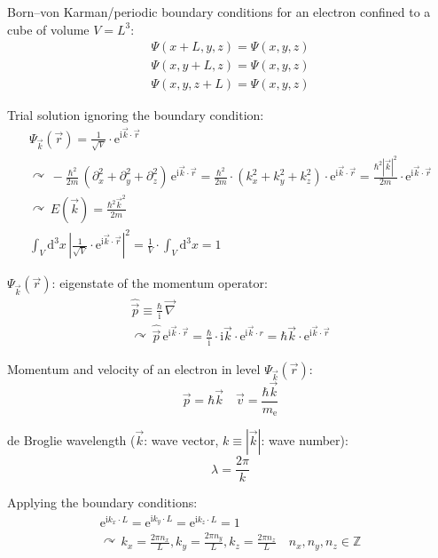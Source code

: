 \documentclass[fontsize=11pt,a4paper]{scrartcl}
\begin{document}
Born--von Karman/periodic boundary conditions for an electron confined to a cube of volume $V=L^3$:
\begin{gather*}
	\Psi(x+L,y,z)=\Psi(x,y,z)\\
	\Psi(x,y+L,z)=\Psi(x,y,z)\\
	\Psi(x,y,z+L)=\Psi(x,y,z)
\end{gather*}

Trial solution ignoring the boundary condition:
\begin{gather*}
	\Psi_{\vec k}(\vec r)=\frac{1}{\sqrt{V}}\cdot\mathrm{e}^{\mathrm{i}\vec k\cdot\vec r}\\
	\curvearrowright\,-\frac{\hbar^2}{2m}\,(\partial_x^2+\partial_y^2+\partial_z^2)\,\mathrm{e}^{\mathrm{i}\vec k\cdot\vec r}=\frac{\hbar^2}{2m}\cdot(k_x^2+k_y^2+k_z^2)\cdot\mathrm{e}^{\mathrm{i}\vec k\cdot\vec r}=\frac{\hbar^2|\vec k|^2}{2m}\cdot\mathrm{e}^{\mathrm{i}\vec k\cdot\vec r}\\
	\curvearrowright\,E(\vec k)=\frac{\hbar^2\vec k^2}{2m}\\
	\int_V\mathrm{d}^3x\,\left|\frac{1}{\sqrt{V}}\cdot\mathrm{e}^{\mathrm{i}\vec k\cdot\vec r}\right|^2=\frac{1}{V}\cdot\int_V\mathrm{d}^3x=1
\end{gather*}

$\Psi_{\vec k}(\vec r)$: eigenstate of the momentum operator:
\begin{gather*}
	\hat{\vec{p}}\equiv\frac{\hbar}{\mathrm{i}}\,\vec\nabla\\
	\curvearrowright\,\hat{\vec{p}}\,\mathrm{e}^{\mathrm{i}\vec k\cdot\vec r}=\frac{\hbar}{\mathrm{i}}\cdot\mathrm{i}\vec k\cdot\mathrm{e}^{\mathrm{i}\vec k\cdot r}=\hbar\vec k\cdot\mathrm{e}^{\mathrm{i}\vec k\cdot\vec r}
\end{gather*}

Momentum and velocity of an electron in level $\Psi_{\vec k}(\vec r)$:
\[
	\vec p=\hbar\vec k\quad\vec v=\frac{\hbar\vec k}{m_\mathrm{e}}
\]

de Broglie wavelength ($\vec k$: wave vector, $k\equiv|\vec k|$: wave number):
\[
	\lambda=\frac{2\pi}{k}
\]

Applying the boundary conditions:
\begin{gather*}
	\mathrm{e}^{\mathrm{i}k_x\cdot L}=\mathrm{e}^{\mathrm{i}k_y\cdot L}=\mathrm{e}^{\mathrm{i}k_z\cdot L}=1\\
	\curvearrowright\,k_x=\frac{2\pi n_x}{L},k_y=\frac{2\pi n_y}{L},k_z=\frac{2\pi n_z}{L}\quad n_x,n_y,n_z\in\mathbb{Z}
\end{gather*}
\end{document}
